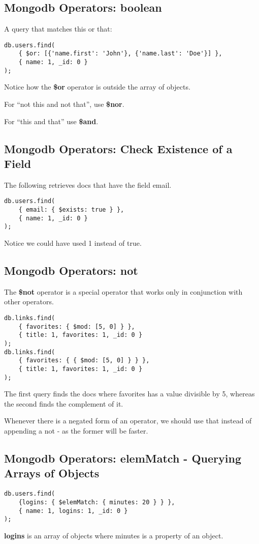 \documentclass[a4paper, 12pt]{article}
\begin{document}
\subsection{Mongodb Operators: boolean}
A query that matches this or that:
\begin{verbatim}
db.users.find(
    { $or: [{'name.first': 'John'}, {'name.last': 'Doe'}] },
    { name: 1, _id: 0 }
);
\end{verbatim}
Notice how the \textbf{\$or} operator is outside the array of objects. 

For ``not this and not that'', use \textbf{\$nor}.

For ``this and that'' use \textbf{\$and}.
\subsection{Mongodb Operators: Check Existence of a Field}
The following retrieves docs that have the field email.
\begin{verbatim}
db.users.find(
    { email: { $exists: true } }, 
    { name: 1, _id: 0 }
);
\end{verbatim}
Notice we could have used 1 instead of true.
\subsection{Mongodb Operators: not}
The \textbf{\$not} operator is a special operator that works only in conjunction with other operators.
\begin{verbatim}
db.links.find(
    { favorites: { $mod: [5, 0] } }, 
    { title: 1, favorites: 1, _id: 0 }
);
db.links.find(
    { favorites: { { $mod: [5, 0] } } },
    { title: 1, favorites: 1, _id: 0 }
);
\end{verbatim}
The first query finds the docs where favorites has a value divisible by 5, whereas the second finds the complement of it.

Whenever there is a negated form of an operator, we should use that instead of appending a not - as the former will be faster.
\subsection{Mongodb Operators: elemMatch - Querying Arrays of Objects}
\begin{verbatim}
db.users.find(
    {logins: { $elemMatch: { minutes: 20 } } }, 
    { name: 1, logins: 1, _id: 0 }
);
\end{verbatim}
\textbf{logins} is an array of objects where minutes is a property of an object.
\end{document}
